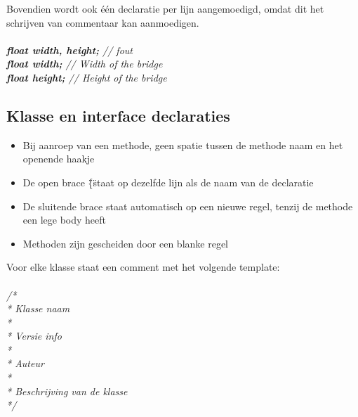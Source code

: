 		Bovendien wordt ook één declaratie per lijn aangemoedigd, omdat dit het schrijven van commentaar kan aanmoedigen.
		\\ \\
		\emph{\textbf{float width, height;} // fout} \\
		\emph{\textbf{float width;} // Width of the bridge} \\
		\emph{\textbf{float height;} // Height of the bridge}
		

\subsection{Klasse en interface declaraties}
	\begin{itemize}
		\item{Bij aanroep van een methode, geen spatie tussen de methode naam en het openende haakje}
		\item{De open brace \"\{\" staat op dezelfde lijn als de naam van de declaratie}
		\item{De sluitende brace staat automatisch op een nieuwe regel, tenzij de methode een lege body heeft}
		\item{Methoden zijn gescheiden door een blanke regel}
	\end{itemize}
	Voor elke klasse staat een comment met het volgende template:
	\\
	\\
	\emph{/*} \\
	\emph{ * Klasse naam} \\
	\emph{ *} \\
	\emph{ * Versie info} \\
	\emph{ *} \\
	\emph{ * Auteur} \\
	\emph{ *} \\
	\emph{ * Beschrijving van de klasse} \\
	\emph{*/} 
